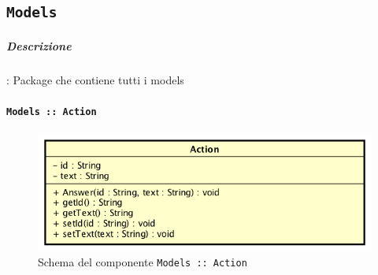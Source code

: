 \documentclass[../DefinizioneDiProdotto_v2.0.0.tex]{subfiles}
\begin{document}
	\newpage
	\subsection{\texttt{Models}}
		\subparagraph{Descrizione}: Package che contiene tutti i models


	\paragraph{\texttt{Models :: Action}}
	\acapo
	\begin{figure}[!h]
		\centering
		\includegraphics[scale=0.6]{Architettura/Front-End/Models/Action.png}
		\caption{Schema del componente \texttt{Models :: Action}}
	\end{figure}
\end{document}
